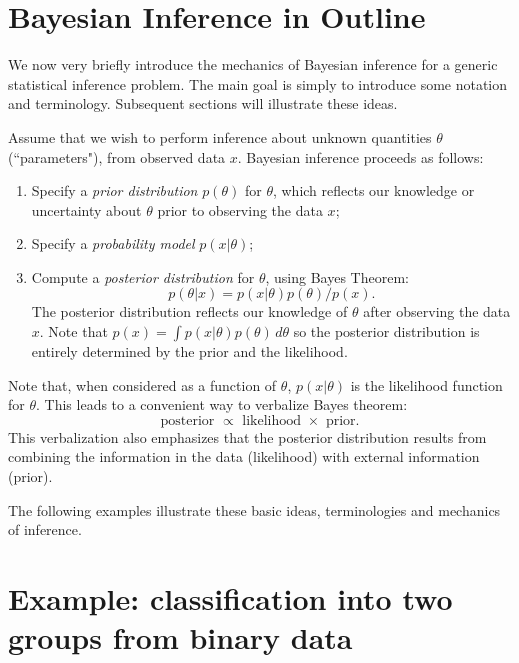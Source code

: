 \documentclass[times,11pt]{article}
\def\data{x}
\begin{document}
\section*{Bayesian Inference in Outline}

We now very briefly introduce the mechanics of Bayesian inference for a generic statistical inference problem.
The main goal is simply to introduce some notation and terminology. Subsequent sections will illustrate these ideas.

Assume that we wish to perform inference about unknown quantities $\theta$ (``parameters"), from observed data
$\data$. Bayesian inference proceeds as follows:
\begin{enumerate}
\item Specify a {\it prior distribution} $p(\theta)$ for $\theta$, which reflects our knowledge or uncertainty about
$\theta$ prior to observing the data $\data$;
\item Specify a {\it probability model} $p(\data|\theta)$; 
\item Compute a {\it posterior distribution} for $\theta$, using Bayes Theorem: 
\begin{equation}
p(\theta | \data) = p( \data |\theta) p(\theta)/p( \data).
\end{equation} 
The posterior distribution reflects our knowledge of $\theta$ after observing the data $\data$.
Note that $p(\data) = \int p(\data | \theta) p(\theta) \, d\theta$ so the posterior distribution is entirely determined by the prior and the likelihood.
\end{enumerate}

Note that, when considered as a function of $\theta$, $p(\data|\theta)$ is the likelihood function for $\theta$. This leads to a convenient way to verbalize Bayes theorem:  \begin{equation}
\text{posterior $\propto$ likelihood $\times$ prior.}
\end{equation}
This verbalization also emphasizes that the posterior distribution results from combining the information in the data (likelihood) with external information (prior).

The following examples illustrate these basic ideas, terminologies and mechanics of inference.

\section*{Example: classification into two groups from binary data}
\end{document}
